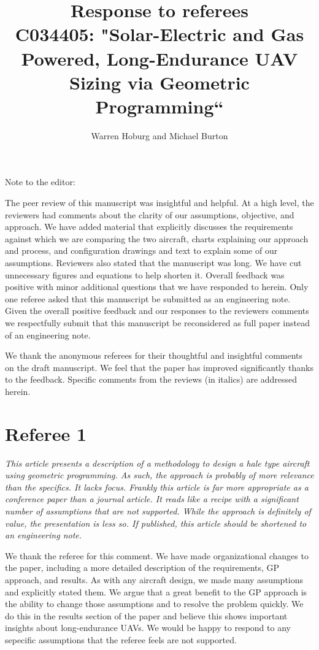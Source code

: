 \documentclass[10pt, a4paper]{article}
\begin{document}
\title{Response to referees \\
C034405: "Solar-Electric and Gas Powered, Long-Endurance UAV Sizing via Geometric Programming``}
\author{Warren Hoburg and Michael Burton}
\maketitle

Note to the editor:

The peer review of this manuscript was insightful and helpful. At a high level, the reviewers had comments about the clarity of our assumptions, objective, and approach.  We have added material that explicitly discusses the requirements against which we are comparing the two aircraft, charts explaining our approach and process, and configuration drawings and text to explain some of our assumptions.  Reviewers also stated that the manuscript was long.  We have cut unnecessary figures and equations to help shorten it.  Overall feedback was positive with minor additional questions that we have responded to herein.  Only one referee asked that this manuscript be submitted as an engineering note.  Given the overall positive feedback and our responses to the reviewers comments we respectfully submit that this manuscript be reconsidered as full paper instead of an engineering note. 

We thank the anonymous referees for their thoughtful and insightful comments on the draft manuscript.
We feel that the paper has improved significantly thanks to the feedback. 
Specific comments from the reviews (in italics) are addressed herein.

\section*{Referee 1}

\emph{
This article presents a description of a methodology to design a hale type aircraft using geometric programming.
As such, the approach is probably of more relevance than the specifics.
It lacks focus. Frankly this article is far more appropriate as a conference paper than a journal article. It reads like a recipe with a significant number of assumptions that are not supported.
While the approach is definitely of value, the presentation is less so. If published, this article should be shortened to an engineering note. }

We thank the referee for this comment. We have made organizational changes to the paper, including a more detailed description of the requirements, GP approach, and results. As with any aircraft design, we made many assumptions and explicitly stated them.  We argue that a great benefit to the GP approach is the ability to change those assumptions and to resolve the problem quickly.  We do this in the results section of the paper and believe this shows important insights about long-endurance UAVs. We would be happy to respond to any sepecific assumptions that the referee feels are not supported. 
\end{document}
